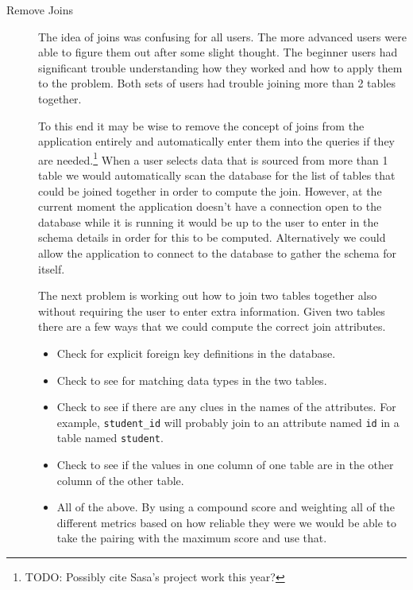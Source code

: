 \begin{description}

\item[Remove Joins] \hfill

The idea of joins was confusing for all users. The more advanced users were
able to figure them out after some slight thought. The beginner users had
significant trouble understanding how they worked and how to apply them to the
problem. Both sets of users had trouble joining more than 2 tables together.

To this end it may be wise to remove the concept of joins from the application
entirely and automatically enter them into the queries if they are
needed.\footnote{TODO: Possibly cite Sasa's project work this year?} When
a user selects data that is sourced from more than 1 table we would
automatically scan the database for the list of tables that could be joined
together in order to compute the join. However, at the current moment the
application doesn't have a connection open to the database while it is running
it would be up to the user to enter in the schema details in order for this to
be computed. Alternatively we could allow the application to connect to the
database to gather the schema for itself.

The next problem is working out how to join two tables together also without
requiring the user to enter extra information. Given two tables there are a few
ways that we could compute the correct join attributes.

\begin{itemize}

\item Check for explicit foreign key definitions in the database.

\item Check to see for matching data types in the two tables.

\item Check to see if there are any clues in the names of the attributes. For
	example, \texttt{student\_id} will probably join to an attribute named
	\texttt{id} in a table named \texttt{student}.

\item Check to see if the values in one column of one table are in the other
	column of the other table.

\item All of the above. By using a compound score and weighting all of the
	different metrics based on how reliable they were we would be able to take
	the pairing with the maximum score and use that.


\end{itemize}
\end{description}
